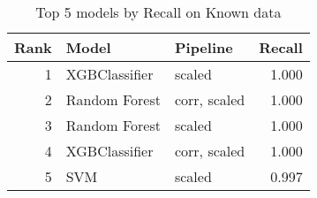\begin{table}[!htb]
\centering
\begin{tabular}{rllr}
\toprule
Rank & Model & Pipeline & Recall \\
\midrule
1 & XGBClassifier & scaled & 1.000 \\
2 & Random Forest & corr, scaled & 1.000 \\
3 & Random Forest & scaled & 1.000 \\
4 & XGBClassifier & corr, scaled & 1.000 \\
5 & SVM & scaled & 0.997 \\
\bottomrule
\end{tabular}
\caption{Top 5 models by Recall on Known data}
\label{table-top-5-recall-known}
\end{table}
